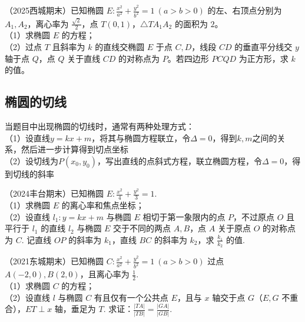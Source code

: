 \begin{example} %
（2025西城期末）已知椭圆 $E:\frac{x^2}{a^2}+\frac{y^2}{b^2}=1\ (a>b>0)$ 的左、右顶点分别为 $A_1,A_2$，离心率为 $\frac{\sqrt{2}}{2}$，点 $T(0,1)$，$\triangle TA_1A_2$ 的面积为 $2$。\\
（1）求椭圆 $E$ 的方程；\\
（2）过点 $T$ 且斜率为 $k$ 的直线交椭圆 $E$ 于点 $C,D$，线段 $CD$ 的垂直平分线交 $y$ 轴于点 $Q$，点 $Q$ 关于直线 $CD$ 的对称点为 $P$。若四边形 $PCQD$ 为正方形，求 $k$ 的值。
\end{example}




\subsection{椭圆的切线}
\noindent 当题目中出现椭圆的切线时，通常有两种处理方式：\\
（1）设直线$y = kx + m$，将其与椭圆方程联立，令$\Delta = 0$，得到$k, m$之间的关系，然后进一步计算得到切点坐标\\
（2）设切线为$P(x_0, y_0)$，写出直线的点斜式方程，联立椭圆方程，令$\Delta = 0$，得到切线的斜率
\begin{example} %
（2024丰台期末）已知椭圆 $E:\frac{x^2}{4}+\frac{y^2}{3}=1$.\\
（1）求椭圆 $E$ 的离心率和焦点坐标；\\
（2）设直线 $l_1:y=kx+m$ 与椭圆 $E$ 相切于第一象限内的点 $P$，不过原点 $O$ 且平行于 $l_1$ 的直线 $l_2$ 与椭圆 $E$ 交于不同的两点 $A,B$，点 $A$ 关于原点 $O$ 的对称点为 $C$. 记直线 $OP$ 的斜率为 $k_1$，直线 $BC$ 的斜率为 $k_2$，求 $\frac{k_1}{k_2}$ 的值.
\end{example}

\begin{example} %
（2021东城期末）已知椭圆 $C:\frac{x^2}{a^2}+\frac{y^2}{b^2}=1\ (a>b>0)$ 过点 $A(-2,0),B(2,0)$，且离心率为 $\frac{1}{2}$.\\
（1）求椭圆 $C$ 的方程；\\
（2）设直线 $l$ 与椭圆 $C$ 有且仅有一个公共点 $E$，且与 $x$ 轴交于点 $G$（$E,G$ 不重合），$ET\perp x$ 轴，垂足为 $T$. 求证：$\frac{\lvert TA\rvert}{\lvert TB\rvert}=\frac{\lvert GA\rvert}{\lvert GB\rvert}$.
\end{example}




\newpage


